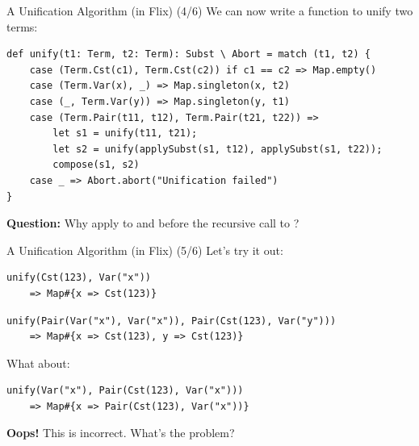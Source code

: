 \begin{frame}[fragile]{A Unification Algorithm (in Flix) (4/6)}
We can now write a function to unify two terms:

\begin{lstlisting}[language=flix, xleftmargin=0.5cm]
def unify(t1: Term, t2: Term): Subst \ Abort = match (t1, t2) {
    case (Term.Cst(c1), Term.Cst(c2)) if c1 == c2 => Map.empty()
    case (Term.Var(x), _) => Map.singleton(x, t2)
    case (_, Term.Var(y)) => Map.singleton(y, t1)
    case (Term.Pair(t11, t12), Term.Pair(t21, t22)) => 
        let s1 = unify(t11, t21);
        let s2 = unify(applySubst(s1, t12), applySubst(s1, t22));
        compose(s1, s2)
    case _ => Abort.abort("Unification failed")
}
\end{lstlisting}

\pause

\textbf{Question:} Why apply  to  and  before the
recursive call to ?
\end{frame}  

\begin{frame}[fragile]{A Unification Algorithm (in Flix) (5/6)}
Let's try it out: 

\begin{lstlisting}[language=flix, xleftmargin=0.5cm]
unify(Cst(123), Var("x")) 
    => Map#{x => Cst(123)}
\end{lstlisting}

\pause 

\begin{lstlisting}[language=flix, xleftmargin=0.5cm]
unify(Pair(Var("x"), Var("x")), Pair(Cst(123), Var("y"))) 
    => Map#{x => Cst(123), y => Cst(123)}
\end{lstlisting}

\pause 

What about:

\begin{lstlisting}[language=flix, xleftmargin=0.5cm]
unify(Var("x"), Pair(Cst(123), Var("x")))
    => Map#{x => Pair(Cst(123), Var("x"))}
\end{lstlisting}

\pause 

\textbf{Oops!} This is incorrect. What's the problem?

\end{frame}

